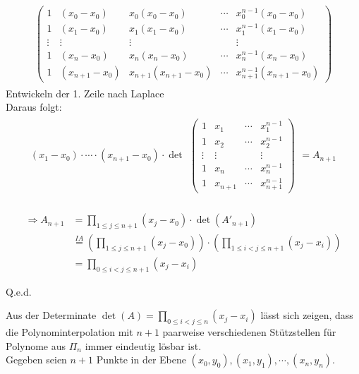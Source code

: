 \begin{itemize}
\begin{align*}
\begin{split}
	\begin{pmatrix}
	1 & (x_0-x_0) & x_0(x_0-x_0) & \cdots & x_0^{n-1}(x_0-x_0) \\
	1 & (x_1-x_0) & x_1(x_1-x_0) & \cdots & x_1^{n-1}(x_1-x_0) \\
	\vdots & \vdots & \vdots &  & \vdots \\
	1 & (x_n-x_0) & x_n(x_n-x_0) & \cdots & x_n^{n-1}(x_n-x_0)\\
	1 & (x_{n+1}-x_0) & x_{n+1}(x_{n+1}-x_0) & \cdots & x_{n+1}^{n-1}(x_{n+1}-x_0)
	\end{pmatrix}
	\end{split}
	\end{align*}
	Entwickeln der 1. Zeile nach Laplace\\
	Daraus folgt:\\
	\begin{align*}
	(x_1-x_0)\cdot \cdots \cdot (x_{n+1}-x_0) \cdot \det
	\begin{split}
	\begin{pmatrix}
	1 & x_1 & \cdots & x_1^{n-1} \\
	1 & x_2 & \cdots & x_2^{n-1} \\
	\vdots & \vdots &  & \vdots \\
	1 & x_n & \cdots & x_n^{n-1}\\
	1 & x_{n+1} & \cdots & x_{n+1}^{n-1}
	\end{pmatrix}
	\end{split}
	=A_{n+1}
	\end{align*}\\
	\begin{align*}
	\Rightarrow A_{n+1} &= \prod \limits_{1 \leq j \leq n+1}(x_j-x_0)\cdot \det(A'_{n+1})\\
	&\stackrel{IA}{=} (\prod \limits_{1 \leq j \leq n+1}(x_j-x_0))\cdot (\prod \limits_{1 \leq i < j \leq n+1}(x_j-x_i))\\
	&= \prod \limits_{0 \leq i < j \leq n+1}(x_j-x_i)
	\end{align*}
\end{itemize}
	\begin{flushright}
		Q.e.d.
	\end{flushright}
	Aus der Determinate $\det(A)=\prod \limits_{0 \leq i < j \leq n}(x_j-x_i)$ lässt sich zeigen, dass die Polynominterpolation mit $n+1$ paarweise verschiedenen Stützstellen für Polynome aus $\Pi_n$ immer eindeutig lösbar ist.\\
	Gegeben seien $n+1$ Punkte in der Ebene $(x_0,y_0),(x_1,y_1),\cdots,(x_n,y_n)$.\\
